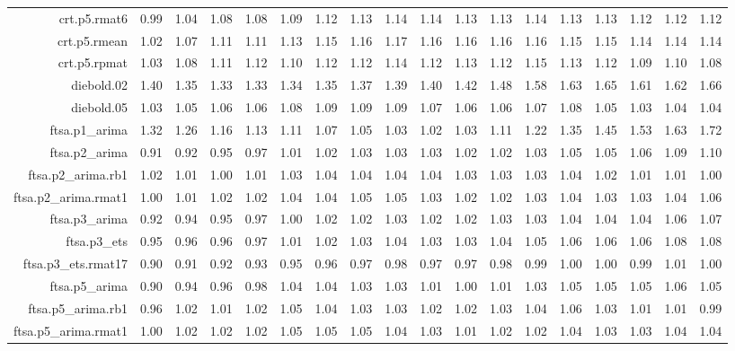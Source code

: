 \begin{tabular}{rrrrrrrrrrrrrrrrrr}
  crt.p5.rmat6 & 0.99 & 1.04 & 1.08 & 1.08 & 1.09 & 1.12 & 1.13 & 1.14 & 1.14 & 1.13 & 1.13 & 1.14 & 1.13 & 1.13 & 1.12 & 1.12 & 1.12 \\ 
  crt.p5.rmean & 1.02 & 1.07 & 1.11 & 1.11 & 1.13 & 1.15 & 1.16 & 1.17 & 1.16 & 1.16 & 1.16 & 1.16 & 1.15 & 1.15 & 1.14 & 1.14 & 1.14 \\ 
  crt.p5.rpmat & 1.03 & 1.08 & 1.11 & 1.12 & 1.10 & 1.12 & 1.12 & 1.14 & 1.12 & 1.13 & 1.12 & 1.15 & 1.13 & 1.12 & 1.09 & 1.10 & 1.08 \\ 
  diebold.02 & 1.40 & 1.35 & 1.33 & 1.33 & 1.34 & 1.35 & 1.37 & 1.39 & 1.40 & 1.42 & 1.48 & 1.58 & 1.63 & 1.65 & 1.61 & 1.62 & 1.66 \\ 
  diebold.05 & 1.03 & 1.05 & 1.06 & 1.06 & 1.08 & 1.09 & 1.09 & 1.09 & 1.07 & 1.06 & 1.06 & 1.07 & 1.08 & 1.05 & 1.03 & 1.04 & 1.04 \\ 
  ftsa.p1\_arima & 1.32 & 1.26 & 1.16 & 1.13 & 1.11 & 1.07 & 1.05 & 1.03 & 1.02 & 1.03 & 1.11 & 1.22 & 1.35 & 1.45 & 1.53 & 1.63 & 1.72 \\ 
  ftsa.p2\_arima & 0.91 & 0.92 & 0.95 & 0.97 & 1.01 & 1.02 & 1.03 & 1.03 & 1.03 & 1.02 & 1.02 & 1.03 & 1.05 & 1.05 & 1.06 & 1.09 & 1.10 \\ 
  ftsa.p2\_arima.rb1 & 1.02 & 1.01 & 1.00 & 1.01 & 1.03 & 1.04 & 1.04 & 1.04 & 1.04 & 1.03 & 1.03 & 1.03 & 1.04 & 1.02 & 1.01 & 1.01 & 1.00 \\ 
  ftsa.p2\_arima.rmat1 & 1.00 & 1.01 & 1.02 & 1.02 & 1.04 & 1.04 & 1.05 & 1.05 & 1.03 & 1.02 & 1.02 & 1.03 & 1.04 & 1.03 & 1.03 & 1.04 & 1.06 \\ 
  ftsa.p3\_arima & 0.92 & 0.94 & 0.95 & 0.97 & 1.00 & 1.02 & 1.02 & 1.03 & 1.02 & 1.02 & 1.03 & 1.03 & 1.04 & 1.04 & 1.04 & 1.06 & 1.07 \\ 
  ftsa.p3\_ets & 0.95 & 0.96 & 0.96 & 0.97 & 1.01 & 1.02 & 1.03 & 1.04 & 1.03 & 1.03 & 1.04 & 1.05 & 1.06 & 1.06 & 1.06 & 1.08 & 1.08 \\ 
  ftsa.p3\_ets.rmat17 & 0.90 & 0.91 & 0.92 & 0.93 & 0.95 & 0.96 & 0.97 & 0.98 & 0.97 & 0.97 & 0.98 & 0.99 & 1.00 & 1.00 & 0.99 & 1.01 & 1.00 \\ 
  ftsa.p5\_arima & 0.90 & 0.94 & 0.96 & 0.98 & 1.04 & 1.04 & 1.03 & 1.03 & 1.01 & 1.00 & 1.01 & 1.03 & 1.05 & 1.05 & 1.05 & 1.06 & 1.05 \\ 
  ftsa.p5\_arima.rb1 & 0.96 & 1.02 & 1.01 & 1.02 & 1.05 & 1.04 & 1.03 & 1.03 & 1.02 & 1.02 & 1.03 & 1.04 & 1.06 & 1.03 & 1.01 & 1.01 & 0.99 \\ 
  ftsa.p5\_arima.rmat1 & 1.00 & 1.02 & 1.02 & 1.02 & 1.05 & 1.05 & 1.05 & 1.04 & 1.03 & 1.01 & 1.02 & 1.02 & 1.04 & 1.03 & 1.03 & 1.04 & 1.04 \\ 

\end{tabular}
